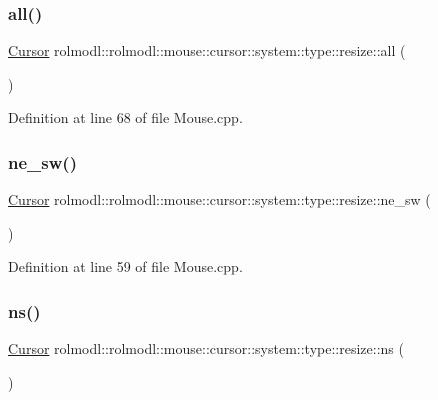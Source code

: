 \subsubsection{\texorpdfstring{all()}{all()}}
{\footnotesize\ttfamily \mbox{\hyperlink{classrolmodl_1_1rolmodl_1_1mouse_1_1_cursor}{Cursor}} rolmodl\+::rolmodl\+::mouse\+::cursor\+::system\+::type\+::resize\+::all (\begin{DoxyParamCaption}{ }\end{DoxyParamCaption})}



Definition at line 68 of file Mouse.\+cpp.

\mbox{\label{namespacerolmodl_1_1rolmodl_1_1mouse_1_1cursor_1_1system_1_1type_1_1resize_aad50235685c466722811637bdebaf30b}} 
\subsubsection{\texorpdfstring{ne\_sw()}{ne\_sw()}}
{\footnotesize\ttfamily \mbox{\hyperlink{classrolmodl_1_1rolmodl_1_1mouse_1_1_cursor}{Cursor}} rolmodl\+::rolmodl\+::mouse\+::cursor\+::system\+::type\+::resize\+::ne\+\_\+sw (\begin{DoxyParamCaption}{ }\end{DoxyParamCaption})}



Definition at line 59 of file Mouse.\+cpp.

\mbox{\label{namespacerolmodl_1_1rolmodl_1_1mouse_1_1cursor_1_1system_1_1type_1_1resize_a51c0dd61cd462de8dd85e3262658a42d}} 
\subsubsection{\texorpdfstring{ns()}{ns()}}
{\footnotesize\ttfamily \mbox{\hyperlink{classrolmodl_1_1rolmodl_1_1mouse_1_1_cursor}{Cursor}} rolmodl\+::rolmodl\+::mouse\+::cursor\+::system\+::type\+::resize\+::ns (\begin{DoxyParamCaption}{ }\end{DoxyParamCaption})}



